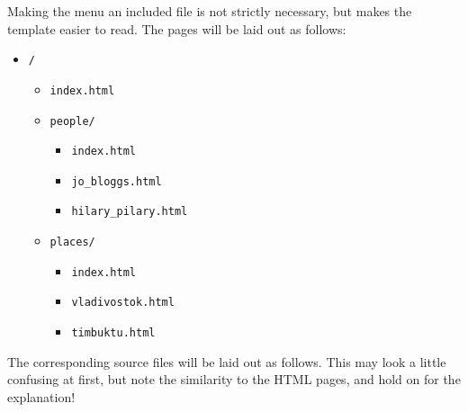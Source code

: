 \documentclass[english]{scrartcl}
\begin{document}
Making the menu an included file is not strictly necessary, but makes the template easier to read. The pages will be laid out as follows:

\begin{itemize}
\item \verb|/|
  \begin{itemize}
  \item \verb|index.html|
  \item \verb|people/|
    \begin{itemize}
    \item \verb|index.html|
    \item \verb|jo_bloggs.html|
    \item \verb|hilary_pilary.html|
    \end{itemize}
  \item \verb|places/|
    \begin{itemize}
    \item \verb|index.html|
    \item \verb|vladivostok.html|
    \item \verb|timbuktu.html|
    \end{itemize}
  \end{itemize}
\end{itemize}

The corresponding source files will be laid out as follows. This may look a little confusing at first, but note the similarity to the HTML pages, and hold on for the explanation!
\end{document}
